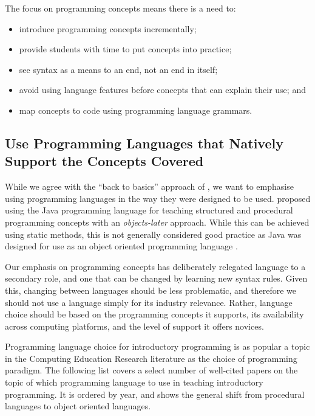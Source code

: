 The focus on programming concepts means there is a need to: %
\begin{itemize}[noitemsep,nolistsep]
	\item introduce programming concepts incrementally;
	\item provide students with time to put concepts into practice;
	\item see syntax as a means to an end, not an end in itself;
	\item avoid using language features before concepts that can explain their use; and
	\item map concepts to code using programming language grammars.
\end{itemize} 


\subsection{Use Programming Languages that Natively Support the Concepts Covered} %
\label{ssub:use_programming_languages_as_they_were_designed_to_be_used}

While we agree with the ``back to basics'' approach of \citet{Reges:2006}, we want to emphasise using programming languages in the way they were designed to be used. \citet{Reges:2006} proposed using the Java programming language for teaching structured and procedural programming concepts with an \emph{objects-later} approach. While this can be achieved using static methods, this is not generally considered good practice as Java was designed for use as an object oriented programming language \citep{Gosling:2005}.

Our emphasis on programming concepts has deliberately relegated language to a secondary role, and one that can be changed by learning new syntax rules. Given this, changing between languages should be less problematic, and therefore we should not use a language simply for its industry relevance. Rather, language choice should be based on the programming concepts it supports, its availability across computing platforms, and the level of support it offers novices.

Programming language choice for introductory programming is as popular a topic in the Computing Education Research literature as the choice of programming paradigm. The following list covers a select number of well-cited papers on the topic of which programming language to use in teaching introductory programming. It is ordered by year, and shows the general shift from procedural languages to object oriented languages.

